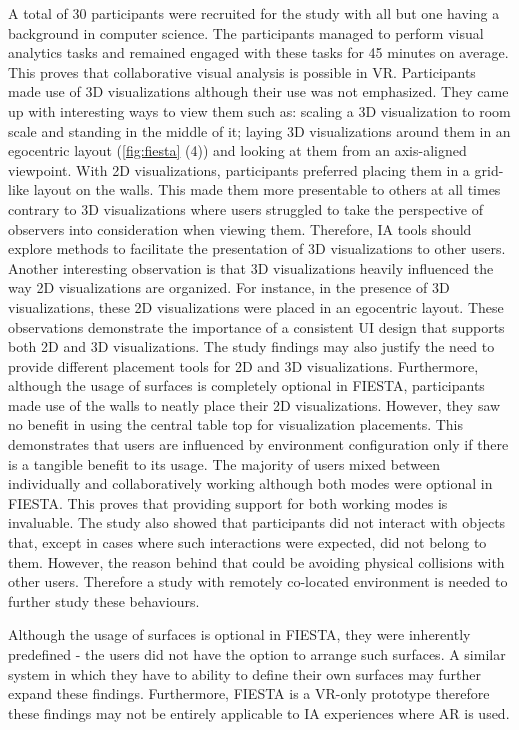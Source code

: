 \documentclass{vgtc}                          %
\begin{document}
\noindent A total of 30 participants were recruited for the study with all but
one having a background in computer science. The participants managed to
perform visual analytics tasks and remained engaged with these tasks for 45
minutes on average. This proves that collaborative visual analysis is possible
in VR. Participants made use of 3D visualizations although their use was not
emphasized. They came up with interesting ways to view them such as: scaling a
3D visualization to room scale and standing in the middle of it; laying 3D
visualizations around them in an egocentric layout (\autoref{fig:fiesta} (4)) and
looking at them from an axis-aligned viewpoint. With 2D visualizations,
participants preferred placing them in a grid-like layout on the walls. This
made them more presentable to others at all times contrary to 3D visualizations
where users struggled to take the perspective of observers into consideration
when viewing them. Therefore, IA tools should explore methods to facilitate the
presentation of 3D visualizations to other users. Another interesting
observation is that 3D visualizations heavily influenced the way 2D
visualizations are organized. For instance, in the presence of 3D
visualizations, these 2D visualizations were placed in an egocentric layout.
These observations demonstrate the importance of a consistent UI design that
supports both 2D and 3D visualizations. The study findings may also justify
the need to provide different placement tools for 2D and 3D visualizations.
Furthermore, although the usage of surfaces is completely optional in FIESTA,
participants made use of the walls to neatly place their 2D visualizations.
However, they saw no benefit in using the central table top for visualization
placements. This demonstrates that users are influenced by environment
configuration only if there is a tangible benefit to its usage. The majority
of users mixed between individually and collaboratively working although both
modes were optional in FIESTA. This proves that providing support for both
working modes is invaluable. The study also showed that participants did not
interact with objects that, except in cases where such interactions were
expected, did not belong to them. However, the reason behind that could be
avoiding physical collisions with other users. Therefore a study with remotely
co-located environment is needed to further study these behaviours.

\medskip

\noindent Although the usage of surfaces is optional in FIESTA, they were
inherently predefined - the users did not have the option to arrange such
surfaces. A similar system in which they have to ability to define their own
surfaces may further expand these findings. Furthermore, FIESTA is a VR-only
prototype therefore these findings may not be entirely applicable to IA experiences
where AR is used.
\end{document}
